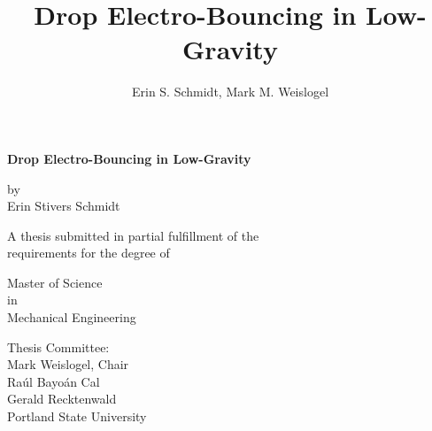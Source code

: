 \documentclass[12pt,a4paper,oneside]{book}
\title{\textsf{\textbf{Drop Electro-Bouncing in Low-Gravity}}}
\author{Erin S. Schmidt, Mark M. Weislogel}
\date{}
\newcommand\blankpage{%
    \null
    \thispagestyle{empty}%
    \addtocounter{page}{-1}%
    \newpage}
\begin{document}
\newcommand{\redline}{\raisebox{2pt}{\tikz{\draw[-,red,solid,line width = 1.5pt](0,0) -- (5mm,0);}}}
\begin{titlepage}
\doublespacing

\centering %
{\large \textsf{\textbf{Drop Electro-Bouncing in Low-Gravity}}}

\vspace{15ex}
by\\
Erin Stivers Schmidt

\vspace{15ex}
\singlespacing
A thesis submitted in partial fulfillment of the\\
requirements for the degree of

\vspace{11ex}
Master of Science\\
in\\
Mechanical Engineering

\vspace{12ex}
Thesis Committee:\\
Mark Weislogel, Chair\\
Ra\'ul Bayo\'an Cal\\
Gerald Recktenwald\\


\vfill
\vspace{2ex}
Portland State University\\%
{\number\year}
\end{titlepage}


\clearpage

\frontmatter

\end{document}

